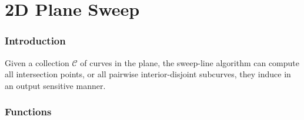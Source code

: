 \chapter{2D Plane Sweep}

\subsection*{Introduction}

Given a collection ${\mathcal C}$ of curves in the plane, the sweep-line
algorithm can compute all intersection points, or all pairwise interior-disjoint
subcurves, they induce in an output sensitive manner.

\subsection*{Functions}

\\
\\
